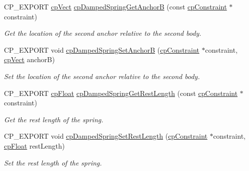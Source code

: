 \begin{DoxyCompactItemize}
C\+P\+\_\+\+E\+X\+P\+O\+RT \mbox{\hyperlink{structcp_vect}{cp\+Vect}} \mbox{\hyperlink{group__cp_damped_spring_gaa6cf571d70ab369a6c4068df420a00f1}{cp\+Damped\+Spring\+Get\+AnchorB}} (const \mbox{\hyperlink{structcp_constraint}{cp\+Constraint}} $\ast$constraint)
\begin{DoxyCompactList}\small\item\em Get the location of the second anchor relative to the second body. \end{DoxyCompactList}\item 
\mbox{\label{group__cp_damped_spring_gac4f4180f4657f77a2698e98ab5149c90}} 
C\+P\+\_\+\+E\+X\+P\+O\+RT void \mbox{\hyperlink{group__cp_damped_spring_gac4f4180f4657f77a2698e98ab5149c90}{cp\+Damped\+Spring\+Set\+AnchorB}} (\mbox{\hyperlink{structcp_constraint}{cp\+Constraint}} $\ast$constraint, \mbox{\hyperlink{structcp_vect}{cp\+Vect}} anchorB)
\begin{DoxyCompactList}\small\item\em Set the location of the second anchor relative to the second body. \end{DoxyCompactList}\item 
\mbox{\label{group__cp_damped_spring_gaf70dea86936946e0888fb05ff7813b8a}} 
C\+P\+\_\+\+E\+X\+P\+O\+RT \mbox{\hyperlink{group__basic_types_gac1ed65573e035bf892505768c852d8d3}{cp\+Float}} \mbox{\hyperlink{group__cp_damped_spring_gaf70dea86936946e0888fb05ff7813b8a}{cp\+Damped\+Spring\+Get\+Rest\+Length}} (const \mbox{\hyperlink{structcp_constraint}{cp\+Constraint}} $\ast$constraint)
\begin{DoxyCompactList}\small\item\em Get the rest length of the spring. \end{DoxyCompactList}\item 
\mbox{\label{group__cp_damped_spring_ga4809ef7ab843a29125daca2153a3960e}} 
C\+P\+\_\+\+E\+X\+P\+O\+RT void \mbox{\hyperlink{group__cp_damped_spring_ga4809ef7ab843a29125daca2153a3960e}{cp\+Damped\+Spring\+Set\+Rest\+Length}} (\mbox{\hyperlink{structcp_constraint}{cp\+Constraint}} $\ast$constraint, \mbox{\hyperlink{group__basic_types_gac1ed65573e035bf892505768c852d8d3}{cp\+Float}} rest\+Length)
\begin{DoxyCompactList}\small\item\em Set the rest length of the spring. \end{DoxyCompactList}\item 

\end{DoxyCompactItemize}
